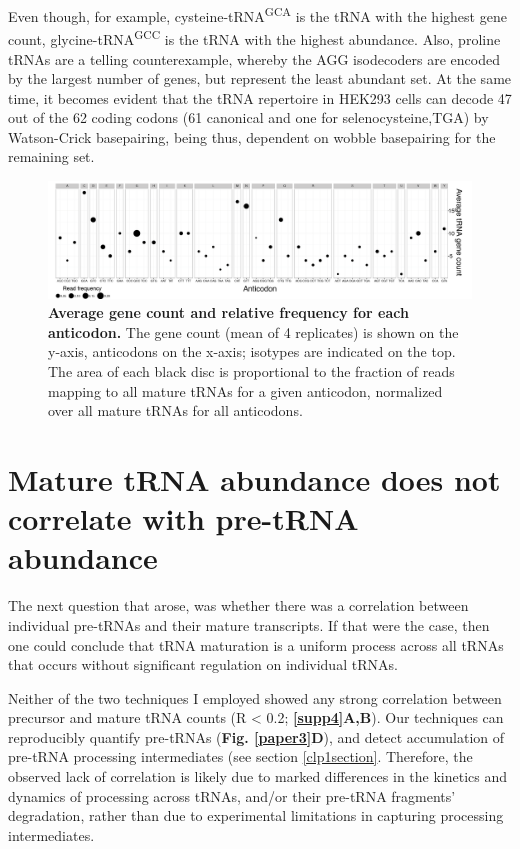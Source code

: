 \documentclass[12pt]{rockefeller}
\newcommand{\super}[1]{\textsuperscript{#1}}
\begin{document}
Even though, for example, cysteine-tRNA\super{GCA} is the tRNA with the highest gene count, glycine-tRNA\super{GCC} is the tRNA with the highest abundance. Also, proline tRNAs are a telling counterexample, whereby the AGG isodecoders are encoded by the largest number of genes, but represent the least abundant set. At the same time, it becomes evident that the tRNA repertoire in HEK293 cells can decode 47 out of the 62 coding codons (61 canonical and one for selenocysteine,TGA) by Watson-Crick basepairing, being thus, dependent on wobble basepairing for the remaining set. 
\bigskip

\begin{figure}[!ht]%
\centering
\includegraphics[width=\textwidth]{paper4D.png}%
\caption[Average gene count and relative frequency for each anticodon.] 
{\textbf{Average gene count and relative frequency for each anticodon.}
The gene count (mean of 4 replicates) is shown on the y-axis, anticodons on the x-axis; isotypes are indicated on the top. The area of each black disc is proportional to the fraction of reads mapping to all mature tRNAs for a given anticodon, normalized over all mature tRNAs for all anticodons.}
\centering
\label{discs}%
\end{figure}

\section{Mature tRNA abundance does not correlate with pre-tRNA abundance}
The next question that arose, was whether there was a correlation between individual pre-tRNAs and their mature transcripts. If that were the case, then one could conclude that tRNA maturation is a uniform process across all tRNAs that occurs without significant regulation on individual tRNAs.

Neither of the two techniques I employed showed any strong correlation between precursor and mature tRNA counts (R < 0.2; \textbf{\ref{supp4}A,B}). Our techniques can reproducibly quantify pre-tRNAs (\textbf{Fig. \ref{paper3}D}), and detect accumulation of pre-tRNA processing intermediates (see section \ref{clp1section}. Therefore, the observed lack of correlation is likely due to marked differences in the kinetics and dynamics of processing across tRNAs, and/or their pre-tRNA fragments' degradation, rather than due to experimental limitations in capturing processing intermediates. 
\end{document}
